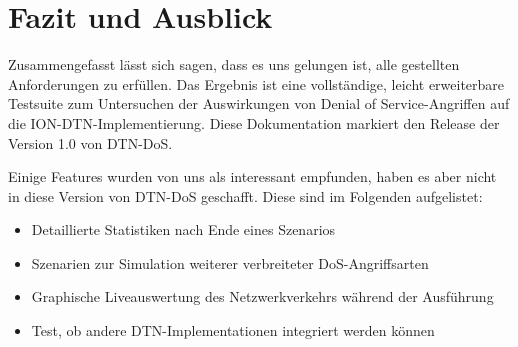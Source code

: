 \documentclass{article}
\begin{document}
\section{Fazit und Ausblick}
Zusammengefasst lässt sich sagen, dass es uns gelungen ist, alle gestellten Anforderungen zu erfüllen. Das Ergebnis ist eine vollständige, leicht erweiterbare Testsuite zum Untersuchen der Auswirkungen von Denial of Service-Angriffen auf die ION-DTN-Implementierung. Diese Dokumentation markiert den Release der Version 1.0 von DTN-DoS.\par
Einige Features wurden von uns als interessant empfunden, haben es aber nicht in diese Version von DTN-DoS geschafft. Diese sind im Folgenden aufgelistet:
\begin{itemize}
    \item Detaillierte Statistiken nach Ende eines Szenarios
    \item Szenarien zur Simulation weiterer verbreiteter DoS-Angriffsarten
    \item Graphische Liveauswertung des Netzwerkverkehrs während der Ausführung
    \item Test, ob andere DTN-Implementationen integriert werden können
\end{itemize}


\newpage
\printbibliography
\end{document}
